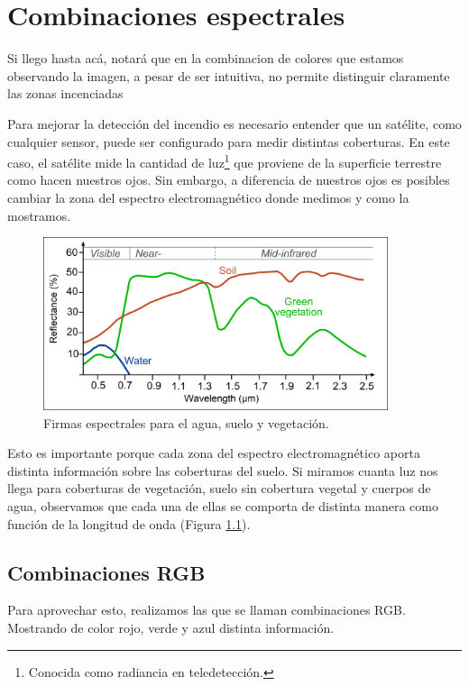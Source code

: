 \documentclass[a4paper,12pt]{book}
\begin{document}
\chapter{Combinaciones espectrales}
Si llego hasta acá, notará que en la combinacion de colores que estamos observando la imagen, a pesar de ser intuitiva, no permite distinguir claramente las zonas incenciadas

Para mejorar la detección del incendio es necesario entender que un satélite, como cualquier sensor, puede ser configurado para medir distintas coberturas. En este caso, el satélite mide la cantidad de luz\footnote{Conocida como radiancia en teledetección.} que proviene de la superficie terrestre como hacen nuestros ojos. Sin embargo, a diferencia de nuestros ojos es posibles cambiar la zona del espectro electromagnético donde medimos y como la mostramos.

\begin{figure}[h!]
    \centering
    \includegraphics[width=0.9\textwidth]{fig:spec.jpg}
    \caption{Firmas espectrales para el agua, suelo y vegetación.}
    \label{fig:spec}
\end{figure}

Esto es importante porque cada zona del espectro electromagnético aporta distinta información sobre las coberturas del suelo. Si miramos cuanta luz nos llega para coberturas de vegetación, suelo sin cobertura vegetal y cuerpos de agua, observamos que cada una de ellas se comporta de distinta manera como función de la longitud de onda (Figura \ref{fig:spec}).

\section{Combinaciones RGB}

Para aprovechar esto, realizamos las que se llaman combinaciones RGB. Mostrando de color rojo, verde y azul distinta información.
\end{document}
